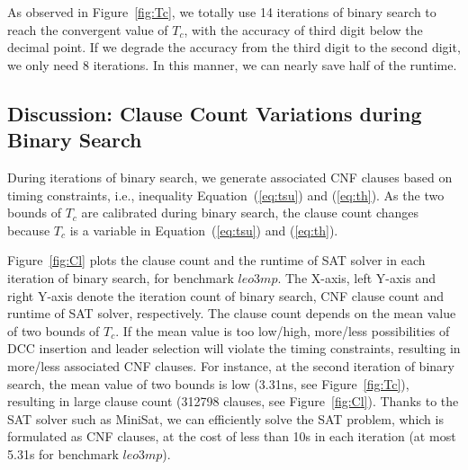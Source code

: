 As observed in Figure~\ref{fig:Tc}, we totally use 14 iterations of binary search to reach the convergent value of $T_{c}$, with the accuracy of third digit below the decimal point. If we degrade the accuracy from the third digit to the second digit, we only need 8 iterations. In this manner, we can nearly save half of the runtime. 

\subsection{Discussion: Clause Count Variations during Binary Search}

During iterations of binary search, we generate associated CNF clauses based on timing constraints, i.e., inequality Equation~(\ref{eq:tsu}) and (\ref{eq:th}).  As the two bounds of $T_{c}$ are calibrated during binary search, the clause count changes because $T_{c}$ is a variable in Equation~(\ref{eq:tsu}) and (\ref{eq:th}). 

Figure~\ref{fig:Cl} plots the clause count and the runtime of SAT solver in each iteration of binary search, for benchmark $leo3mp$. The X-axis, left Y-axis and right Y-axis denote the iteration count of binary search, CNF clause count and runtime of SAT solver, respectively. The clause count depends on the mean value of two bounds of $T_{c}$. If the mean value is too low/high, more/less possibilities of DCC insertion and leader selection will violate the timing constraints, resulting in more/less associated CNF clauses. For instance, at the second iteration of binary search, the mean value of two bounds is low (3.31ns, see Figure~\ref{fig:Tc}), resulting in large clause count (312798 clauses, see Figure~\ref{fig:Cl}). Thanks to the SAT solver such as MiniSat, we can efficiently solve the SAT problem, which is formulated as CNF clauses, at the cost of less than 10s in each iteration (at most 5.31s for benchmark $leo3mp$).








